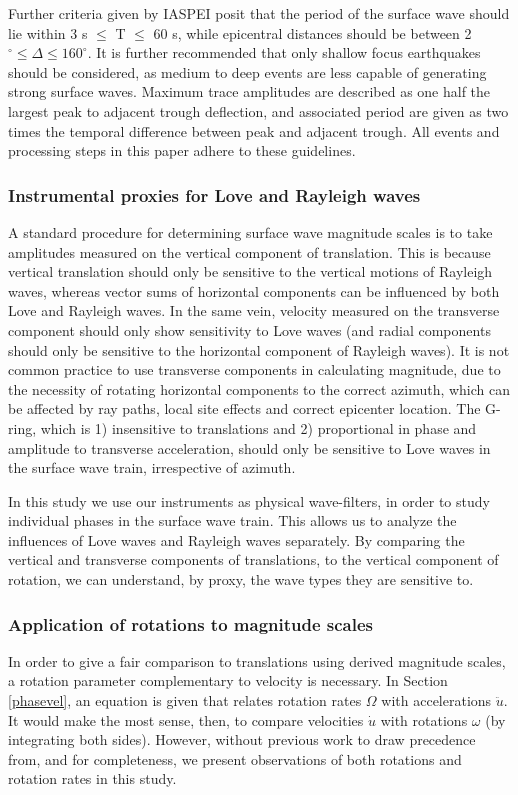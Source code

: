 \documentclass{gji}
\begin{document}
Further criteria given by IASPEI posit that the period of the surface wave should lie within 3 s $\le$ T $\le$ 60 s, while epicentral distances should be between 2$^\circ \le \Delta \le 160^\circ$. It is further recommended that only shallow focus earthquakes should be considered, as medium to deep events are less capable of generating strong surface waves.
Maximum trace amplitudes are described as one half the largest peak to adjacent trough deflection, and associated period are given as two times the temporal difference between peak and adjacent trough. All events and processing steps in this paper adhere to these guidelines.

\subsubsection{Instrumental proxies for Love and Rayleigh waves}\label{proxy}
A standard procedure for determining surface wave magnitude scales is to take amplitudes measured on the vertical component of translation. This is because vertical translation should only be sensitive to the vertical motions of Rayleigh waves, whereas vector sums of horizontal components can be influenced by both Love and Rayleigh waves. In the same vein, velocity measured on the transverse component should only show sensitivity to Love waves (and radial components should only be sensitive to the horizontal component of Rayleigh waves). It is not common practice to use transverse components in calculating magnitude, due to the necessity of rotating horizontal components to the correct azimuth, which can be affected by ray paths, local site effects and correct epicenter location. The G-ring, which is 1) insensitive to translations and 2) proportional in phase and amplitude to transverse acceleration, should only be sensitive to Love waves in the surface wave train, irrespective of azimuth.  

In this study we use our instruments as physical wave-filters, in order to study individual phases in the surface wave train. This allows us to analyze the influences of Love waves and Rayleigh waves separately. By comparing the vertical and transverse components of translations, to the vertical component of rotation, we can understand, by proxy, the wave types they are sensitive to.

\subsubsection{Application of rotations to magnitude scales}
In order to give a fair comparison to translations using derived magnitude scales, a rotation parameter complementary to velocity is necessary. In Section \ref{phasevel}, an equation is given that relates rotation rates $\Omega$ with accelerations $\ddot{u}$. It would make the most sense, then, to compare velocities $\dot{u}$ with rotations $\omega$ (by integrating both sides). However, without previous work to draw precedence from, and for completeness, we present observations of both rotations and rotation rates in this study.
\end{document}
